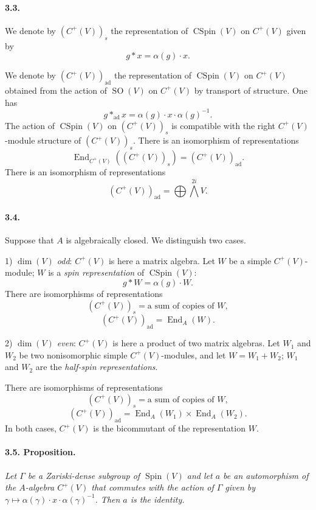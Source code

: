 \documentclass[10pt,leqno]{article}
\newcommand{\End}{\operatorname{End}}
\newcommand{\SO}{\operatorname{SO}}
\newcommand{\Spin}{\operatorname{Spin}}
\newcommand{\CSpin}{\operatorname{CSpin}}
\newcommand{\ad}{\operatorname{ad}}
\begin{document}
\paragraph{3.3.} We denote by $(C^+(V))_s$ the representation of $\CSpin(V)$ on $C^+(V)$ given by
\[
\tag{3.3.1}
g*x=\alpha(g)\cdot x.
\]

\clearpage

We denote by $(C^+(V))_{\ad}$ the representation of $\CSpin(V)$ on $C^+(V)$ obtained from the action of $\SO(V)$ on $C^+(V)$ by transport of structure. One has
\[
\tag{3.3.2}
g*_{\ad}x=\alpha(g)\cdot x\cdot\alpha(g)^{-1}.
\]
The action of $\CSpin(V)$ on $(C^+(V))_s$ is compatible with the right $C^+(V)$-module structure of $(C^+(V))_s$. There is an isomorphism of representations
\[
\tag{3.3.3}
\End_{C^+(V)}((C^+(V))_s)=(C^+(V))_{\ad}.
\]
There is an isomorphism of representations
\[
\tag{3.3.4}
(C^+(V))_{\ad}=\bigoplus \bigwedge^{2i} V.
\]

\paragraph{3.4.} Suppose that $A$ is algebraically closed. We distinguish two cases.

1) \emph{$\dim(V)$ odd}: $C^+(V)$ is here a matrix algebra. Let $W$ be a simple $C^+(V)$-module; $W$ is a \emph{spin representation} of $\CSpin(V)$:
\[
g*W=\alpha(g)\cdot W.
\]
There are isomorphisms of representations
\[
\tag{3.4.1}
(C^+(V))_s=\text{a sum of copies of }W,
\]
\[
\tag{3.4.2}
(C^+(V))_{\ad}=\End_A(W).
\]

2) \emph{$\dim(V)$ even}: $C^+(V)$ is here a product of two matrix algebras. Let $W_1$ and $W_2$ be two nonisomorphic simple $C^+(V)$-modules, and let $W=W_1+W_2$; $W_1$ and $W_2$ are the \emph{half-spin representations}.

There are isomorphisms of representations
\[
\tag{3.4.3}
(C^+(V))_s=\text{a sum of copies of }W,
\]
\[
\tag{3.4.4}
(C^+(V))_{\ad}=\End_A(W_1)\times\End_A(W_2).
\]
In both cases, $C^+(V)$ is the bicommutant of the representation $W$.

\paragraph{3.5. Proposition.} \emph{Let $\Gamma$ be a Zariski-dense subgroup of $\Spin(V)$ and let $a$ be an automorphism of the $A$-algebra $C^+(V)$ that commutes with the action of $\Gamma$ given by $\gamma\mapsto\alpha(\gamma)\cdot x\cdot\alpha(\gamma)^{-1}$. Then $a$ is the identity.}
\end{document}
